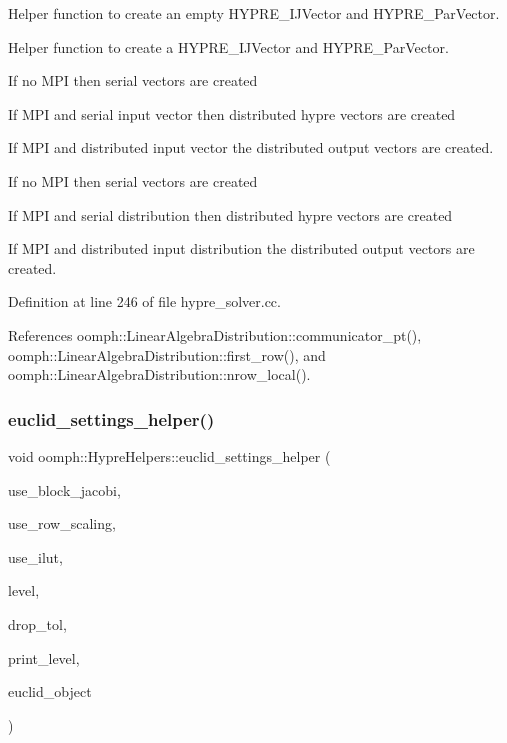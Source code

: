 Helper function to create an empty H\+Y\+P\+R\+E\+\_\+\+I\+J\+Vector and H\+Y\+P\+R\+E\+\_\+\+Par\+Vector. 

Helper function to create a H\+Y\+P\+R\+E\+\_\+\+I\+J\+Vector and H\+Y\+P\+R\+E\+\_\+\+Par\+Vector.
\begin{DoxyItemize}
\item If no M\+PI then serial vectors are created
\item If M\+PI and serial input vector then distributed hypre vectors are created
\item If M\+PI and distributed input vector the distributed output vectors are created.
\item If no M\+PI then serial vectors are created
\item If M\+PI and serial distribution then distributed hypre vectors are created
\item If M\+PI and distributed input distribution the distributed output vectors are created. 
\end{DoxyItemize}

Definition at line 246 of file hypre\+\_\+solver.\+cc.



References oomph\+::\+Linear\+Algebra\+Distribution\+::communicator\+\_\+pt(), oomph\+::\+Linear\+Algebra\+Distribution\+::first\+\_\+row(), and oomph\+::\+Linear\+Algebra\+Distribution\+::nrow\+\_\+local().

\mbox{\label{namespaceoomph_1_1HypreHelpers_ab0a885165f387f79bc30e19810d111d7}} 
\subsubsection{\texorpdfstring{euclid\+\_\+settings\+\_\+helper()}{euclid\_settings\_helper()}}
{\footnotesize\ttfamily void oomph\+::\+Hypre\+Helpers\+::euclid\+\_\+settings\+\_\+helper (\begin{DoxyParamCaption}\item[{const bool \&}]{use\+\_\+block\+\_\+jacobi,  }\item[{const bool \&}]{use\+\_\+row\+\_\+scaling,  }\item[{const bool \&}]{use\+\_\+ilut,  }\item[{const int \&}]{level,  }\item[{const double \&}]{drop\+\_\+tol,  }\item[{const int \&}]{print\+\_\+level,  }\item[{H\+Y\+P\+R\+E\+\_\+\+Solver \&}]{euclid\+\_\+object }\end{DoxyParamCaption})}



